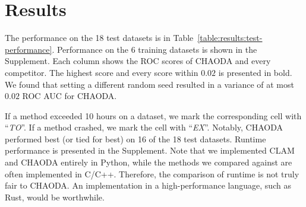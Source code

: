 \section{Results}
\label{sec:results}

The performance on the 18 test datasets is in Table~\ref{table:results:test-performance}.
Performance on the 6 training datasets is shown in the Supplement.
Each column shows the ROC scores of CHAODA and every competitor.
The highest score and every score within $0.02$ is presented in bold.
We found that setting a different random seed resulted in a variance of at most $0.02$ ROC AUC for CHAODA.

If a method exceeded 10 hours on a dataset, we mark the corresponding cell with ``\textit{TO}''.
If a method crashed, we mark the cell with ``\textit{EX}''.
Notably, CHAODA performed best (or tied for best) on 16 of the 18 test datasets.
Runtime performance is presented in the Supplement. 
Note that we implemented CLAM and CHAODA entirely in Python, while the methods we compared against are often implemented in C/C++.
Therefore, the comparison of runtime is not truly fair to CHAODA.
An implementation in a high-performance language, such as Rust, would be worthwhile.

